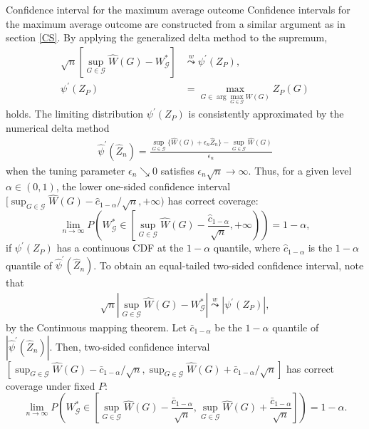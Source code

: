\documentclass[12pt,oneside,reqno,english]{amsart}
\makeatletter
\renewcommand\subsubsection{\@startsection{subsubsection}{3}%
  \z@{.5\linespacing\@plus.7\linespacing}{-.5em}%
  {\normalfont\scshape}}
\theoremstyle{definition}
\makeatother
\begin{document}
\subsubsection{Confidence interval for the maximum average outcome} 
Confidence intervals for the maximum average outcome are constructed from a similar argument as in section \ref{CS}. 
By applying the generalized delta method to the supremum, 
\begin{align}
\sqrt{n}\left[\sup_{G\in \mathcal{G}}\hat{W}(G)-W^{*}_{\mathcal{G}}\right]
&\overset{w}{\underset{}{\leadsto}}\psi^{\prime}(Z_{P}),\label{eq:limdist1}\\
\psi^{\prime}(Z_{P})&=\max_{G\in \arg\max_{G\in \mathcal{G}}W(G)}Z_{P}(G)\nonumber
\end{align}
holds. The limiting distribution $\psi^{\prime}(Z_{P})$ is consistently approximated by the numerical delta method 
\begin{align*}
\hat{\psi}^{\prime}(\hat{Z}_{n})=\frac{\sup_{G\in \mathcal{G}}\{\hat{W}(G)+\epsilon_{n}\hat{Z}_{n}\}-\sup_{G\in \mathcal{G}}\hat{W}(G)}{\epsilon_{n}}
\end{align*} 
when the tuning parameter $\epsilon_{n}\searrow 0$ satisfies $\epsilon_{n}\sqrt{n}\rightarrow \infty$. 
Thus, for a given level $\alpha\in (0,1)$, the lower one-sided confidence interval $[\sup_{G\in \mathcal{G}}\hat{W}(G)-\hat{c}_{1-\alpha}/\sqrt{n}, +\infty)$ has correct coverage:
\[\lim_{n\rightarrow \infty} P\left(W^{*}_{\mathcal{G}}\in \left[\sup_{G\in \mathcal{G}}\hat{W}(G)-\frac{\hat{c}_{1-\alpha}}{\sqrt{n}}, +\infty \right)\right)=1-\alpha,\]
if $\psi^{\prime}(Z_{P})$ has a continuous CDF at the $1-\alpha$ quantile, where $\hat{c}_{1-\alpha}$ is the $1-\alpha$ quantile of $\hat{\psi}^{\prime}(\hat{Z}_{n})$. 
To obtain an equal-tailed two-sided confidence interval, note that
\begin{align}
\sqrt{n}\left|\sup_{G\in \mathcal{G}}\hat{W}(G)-W^{*}_{\mathcal{G}}\right| 
\overset{w}{\underset{}{\leadsto}}\left| \psi^{\prime}(Z_{P})\right|,\label{eq:limdist2}
\end{align}
by the Continuous mapping theorem. Let $\bar{c}_{1-\alpha}$ be the $1-\alpha$ quantile of $|\hat{\psi}^{\prime}(\hat{Z}_{n})|$.  
Then, two-sided confidence interval $[\sup_{G\in \mathcal{G}}\hat{W}(G)-\bar{c}_{1-\alpha}/\sqrt{n},\sup_{G\in \mathcal{G}}\hat{W}(G)+\bar{c}_{1-\alpha}/\sqrt{n}]$ has correct coverage under fixed $P$:
\[\lim_{n\rightarrow \infty} P\left(W^{*}_{\mathcal{G}}\in \left[\sup_{G\in \mathcal{G}}\hat{W}(G)-\frac{\bar{c}_{1-\alpha}}{\sqrt{n}},\sup_{G\in \mathcal{G}}\hat{W}(G)+\frac{\bar{c}_{1-\alpha}}{\sqrt{n}}\right]\right)=1-\alpha.\]
\end{document}
